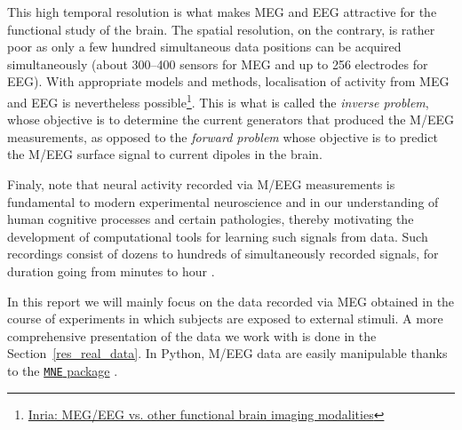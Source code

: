 This high temporal resolution is what makes MEG and EEG attractive for the functional study of the brain.
The spatial resolution, on the contrary, is rather poor as only a few hundred simultaneous data positions can be acquired simultaneously (about \numrange{300}{400} sensors for MEG and up to \num{256} electrodes for EEG).
With appropriate models and methods, localisation of activity from MEG and EEG is nevertheless possible\footnote{\href{https://team.inria.fr/athena/fr/megeeg-vs-other-functional-brain-imaging-modalities/}{Inria: MEG/EEG vs. other functional brain imaging modalities}}.
This is what is called the \textit{inverse problem}, whose objective is to determine the current generators that produced the M/EEG measurements, as opposed to the \textit{forward problem} whose objective is to predict the M/EEG surface signal to current dipoles in the brain.

Finaly, note that neural activity recorded via M/EEG measurements is fundamental to modern experimental neuroscience and in our understanding of human cognitive processes and certain pathologies, thereby motivating the development of computational tools for learning such signals from data.
Such recordings consist of dozens to hundreds of simultaneously recorded signals, for duration going from minutes to hour \citep{jas2017learning, dupre2018multivariate}.

In this report we will mainly focus on the data recorded via MEG obtained in the course of experiments in which subjects are exposed to external stimuli.
A more comprehensive presentation of the data we work with is done in the Section~\ref{res_real_data}.
In Python, M/EEG data are easily manipulable thanks to the \href{https://mne.tools/stable/index.html}{\texttt{MNE} package} \citep{gramfort2013meg}.

